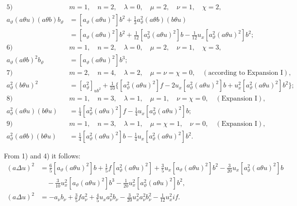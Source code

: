 \documentclass[11pt]{article}
\begin{document}
\begin{align*}
\text{5)}\quad&m=1,\quad n=2,\quad \lambda=0,\quad \mu=2,\quad \nu=1,\quad \chi=2,\\
a_\vartheta(a\theta u)(a\theta b)b_\vartheta
&=[a_\vartheta(a\theta u)^2]b^2+\frac13a_\vartheta^2(a\theta b)(b\theta u)\\
&=[a_\vartheta(a\theta u)^2]b^2+\frac1{12}[a_\vartheta^2(a\theta u)^2]b-\frac1{12}u_x[a_\vartheta^2(a\theta u)^2]b^2;\\[.6em]
\text{6)}\quad&m=1,\quad n=2,\quad \lambda=0,\quad \mu=2,\quad \nu=1,\quad \chi=3,\\
a_\vartheta(a\theta b)^2b_\vartheta&=[a_\vartheta(a\theta u)^2]b^3;\\[.6em]
\text{7)}\quad&m=2,\quad n=4,\quad \lambda=2,\quad \mu=\nu=\chi=0,\quad (\text{according to Expansion I}),\\
a_\vartheta^2(b\theta u)^2&=[a_\vartheta^2]_{ub^2}+\frac1{10}\{[a_\vartheta^2(a\theta u)^2]f-2u_x[a_\vartheta^2(a\theta u)^2]b+u_x^2[a_\vartheta^2(a\theta u)^2]b^2\};\\[.6em]
\text{8)}\quad&m=1,\quad n=3,\quad \lambda=1,\quad \mu=1,\quad \nu=\chi=0,\quad (\text{Expansion I}),\\
a_\vartheta^2(a\theta u)(b\theta u)&=\frac14[a_\vartheta^2(a\theta u)^2]f-\frac14u_x[a_\vartheta^2(a\theta u)^2]b;\\[.6em]
\text{9)}\quad&m=1,\quad n=3,\quad \lambda=1,\quad \mu=\chi=1,\quad \nu=0,\quad (\text{Expansion I}),\\
a_\vartheta^2(a\theta b)(b\theta u)&=\frac14[a_\vartheta^2(a\theta u)^2]b-\frac14u_x[a_\vartheta^2(a\theta u)^2]b^2.
\end{align*}

From 1) and 4) it follows:
\[
\begin{aligned}
(a\Delta u)^2
&=\frac65[a_\vartheta(a\theta u)^2]b+\frac15f[a_\vartheta^2(a\theta u)^2]+\frac35u_x[a_\vartheta(a\theta u)^2]b^2-\frac3{20}u_x[a_\vartheta^2(a\theta u)^2]b\\
&\quad-\frac3{10}u_x^2[a_\vartheta(a\theta u)^2]b^3-\frac1{20}u_x^2[a_\vartheta^2(a\theta u)^2]b^2,\\
(a\Delta u)^2
&=-a_\nu b_\nu+\frac35fa_\nu^2+\frac45u_xa_\nu^2b_\nu-\frac3{20}u_x^2a_\nu^2b_\nu^2-\frac1{12}u_x^2if.
\end{aligned}
\]
\end{document}
